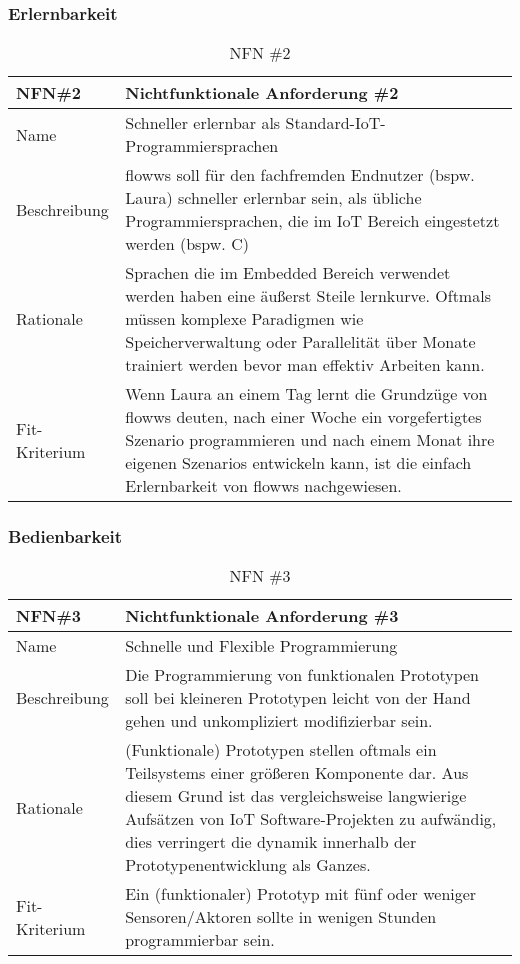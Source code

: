 \subsubsection{Erlernbarkeit}
\begin{table}[H]
\caption{NFN \#2}
\label{tab:nfn2}
\begin{tabularx}{\textwidth}{lX}
\hline
\rowcolor[HTML]{EFEFEF} 
NFN\#2        & Nichtfunktionale Anforderung \#2 \\ \hline
Name          & Schneller erlernbar als Standard-IoT-Programmiersprachen \\ \hline
Beschreibung  & flowws soll für den fachfremden Endnutzer (bspw. Laura) schneller erlernbar sein, als übliche Programmiersprachen, die im IoT Bereich eingestetzt werden (bspw. C)\\ \hline
Rationale     & Sprachen die im Embedded Bereich verwendet werden haben eine äußerst Steile lernkurve. Oftmals müssen komplexe Paradigmen wie Speicherverwaltung oder Parallelität über Monate trainiert werden bevor man effektiv Arbeiten kann. \\ \hline
Fit-Kriterium & Wenn Laura an einem Tag lernt die Grundzüge von flowws deuten, nach einer Woche ein vorgefertigtes Szenario programmieren und nach einem Monat ihre eigenen Szenarios entwickeln kann, ist die einfach Erlernbarkeit von flowws nachgewiesen. \\ \hline
\end{tabularx}
\end{table}

\subsubsection{Bedienbarkeit}
\begin{table}[H]
\caption{NFN \#3}
\label{tab:nfn3}
\begin{tabularx}{\textwidth}{lX}
\hline
\rowcolor[HTML]{EFEFEF} 
NFN\#3        & Nichtfunktionale Anforderung \#3 \\ \hline
Name          & Schnelle und Flexible Programmierung \\ \hline
Beschreibung  & Die Programmierung von funktionalen Prototypen soll bei kleineren Prototypen leicht von der Hand gehen und unkompliziert modifizierbar sein. \\ \hline
Rationale     & (Funktionale) Prototypen stellen oftmals ein Teilsystems einer größeren Komponente dar. Aus diesem Grund ist das vergleichsweise langwierige Aufsätzen von IoT Software-Projekten zu aufwändig, dies verringert die dynamik innerhalb der Prototypenentwicklung als Ganzes. \\ \hline
Fit-Kriterium & Ein (funktionaler) Prototyp mit fünf oder weniger Sensoren/Aktoren sollte in wenigen Stunden programmierbar sein.   \\ \hline 
\end{tabularx}
\end{table}

